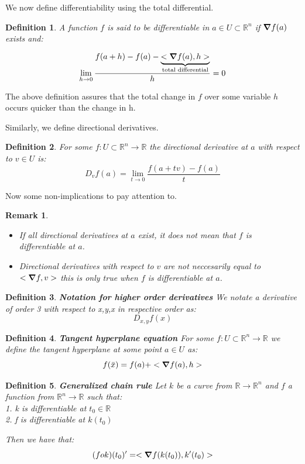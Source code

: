 \documentclass[titlepage]{article}
\newtheorem{remark}{Remark}[section]
\newtheorem{definition}{Definition}
\newcommand{\Rn}{\mathbb{R}^n}
\begin{document}
We now define differentiability using the total differential. 

\begin{definition}
A function $f$ is said to be differentiable in $a \in U \subset \Rn$ if $\grad f(a)$ exists and:

$$\lim_{h \to 0} \frac{f(a+h) - f(a) - \underbrace{<\grad f(a),h>}_{\text{total differential}}}{h} = 0$$
\end{definition}

The above definition assures that the total change in $f$ over some variable $h$ occurs quicker than the change in h. 


Similarly, we define directional derivatives.

\begin{definition}
For some $f:U\subset \Rn \to \mathbb{R}$ the directional derivative at $a$ with respect to $v \in U$ is:
$$D_{v}f(a) = \lim_{t \to 0}\frac{f(a+tv)-f(a)}{t}$$
\end{definition}

Now some non-implications to pay attention to.

\begin{remark} 
\\
\begin{itemize}
    \item If all directional derivatives at $a$ exist, it does not mean that $f$ is differentiable at $a$.
    \item Directional derivatives with respect to $v$ are not neccesarily equal to $<\grad f,v>$ this is only true when $f$ is differentiable at $a$.  
\end{itemize}
\end{remark}

\begin{definition} \textbf{Notation for higher order derivatives}
We notate a derivative of order 3 with respect to x,y,x in respective order as:
$$D_{x,y}f(x)$$
\end{definition}

\begin{definition} \textbf{Tangent hyperplane equation}
For some $f:U\subset \Rn \to \mathbb{R}$ we define the tangent hyperplane at some point $a \in U$ as:
$$f(\bar{x}) = f(a) + <\grad f(a), h>$$
\end{definition}

\begin{definition}\textbf{Generalized chain rule}
Let $k$ be a curve from $\mathbb{R} \to \Rn$ and $f$ a function from $\Rn \to \mathbb{R}$ such that:
\\
1. k is differentiable at $t_{0} \in \mathbb{R}$
\\
2. f is differentiable at $k(t_{0})$

Then we have that:
$$(fok)(t_{0})^{\prime} = <\grad f(k(t_{0})), k^{\prime}(t_{0})>$$
\end{definition}
\end{document}
